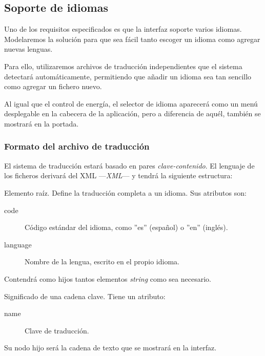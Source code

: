 \smallskip

\subsection{Soporte de idiomas}

Uno de los requisitos especificados es que la interfaz soporte varios idiomas. Modelaremos la solución para que sea fácil tanto escoger un idioma como agregar nuevas lenguas.

Para ello, utilizaremos archivos de traducción independientes que el sistema detectará automáticamente, permitiendo que añadir un idioma sea tan sencillo como agregar un fichero nuevo.

Al igual que el control de energía, el selector de idioma aparecerá como un menú desplegable en la cabecera de la aplicación, pero a diferencia de aquél, también se mostrará en la portada.

\subsubsection{Formato del archivo de traducción}

El sistema de traducción estará basado en pares \textit{clave-contenido}. El lenguaje de los ficheros derivará del \acrshort{XML} ---\textit{\acrlong{XML}}--- y tendrá la siguiente estructura:

\begin{description}[style=nextline]
	\item[translation]
	Elemento raíz. Define la traducción completa a un idioma. Sus atributos son:
	
	\begin{description}
		\item[code] Código estándar del idioma, como ''es'' (español) o ''en'' (inglés).
		\item[language] Nombre de la lengua, escrito en el propio idioma.
	\end{description}
	
	Contendrá como hijos tantos elementos \textit{string} como sea necesario.
	
	\item[string]
	Significado de una cadena clave. Tiene un atributo:
	
	\begin{description}
		\item[name] Clave de traducción.
	\end{description}
	
	Su nodo hijo será la cadena de texto que se mostrará en la interfaz.
\end{description}

